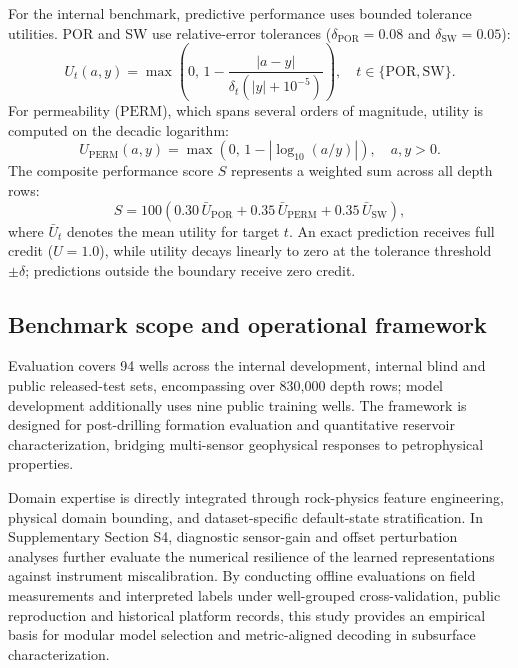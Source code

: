 \documentclass[preprint,12pt,nopreprintline]{elsarticle}
\begin{document}
For the internal benchmark, predictive performance uses bounded tolerance utilities. POR and SW use relative-error tolerances ($\delta_{\mathrm{POR}} = 0.08$ and $\delta_{\mathrm{SW}} = 0.05$):
\begin{equation}
U_t(a, y) = \max\left(0,\, 1 - \frac{|a - y|}{\delta_t (|y| + 10^{-5})}\right), \quad t \in \{\mathrm{POR}, \mathrm{SW}\}.
\end{equation}
For permeability ($\mathrm{PERM}$), which spans several orders of magnitude, utility is computed on the decadic logarithm:
\begin{equation}
U_{\mathrm{PERM}}(a, y) = \max\left(0,\, 1 - |\log_{10}(a/y)|\right), \quad a,y>0.
\end{equation}
The composite performance score $S$ represents a weighted sum across all depth rows:
\begin{equation}
S = 100 \left(0.30\,\bar{U}_{\mathrm{POR}} + 0.35\,\bar{U}_{\mathrm{PERM}} + 0.35\,\bar{U}_{\mathrm{SW}}\right),
\end{equation}
where $\bar{U}_t$ denotes the mean utility for target $t$. An exact prediction receives full credit ($U=1.0$), while utility decays linearly to zero at the tolerance threshold $\pm \delta$; predictions outside the boundary receive zero credit.

\subsection{Benchmark scope and operational framework}
Evaluation covers 94 wells across the internal development, internal blind and public released-test sets, encompassing over 830,000 depth rows; model development additionally uses nine public training wells. The framework is designed for post-drilling formation evaluation and quantitative reservoir characterization, bridging multi-sensor geophysical responses to petrophysical properties.

Domain expertise is directly integrated through rock-physics feature engineering, physical domain bounding, and dataset-specific default-state stratification. In Supplementary Section S4, diagnostic sensor-gain and offset perturbation analyses further evaluate the numerical resilience of the learned representations against instrument miscalibration. By conducting offline evaluations on field measurements and interpreted labels under well-grouped cross-validation, public reproduction and historical platform records, this study provides an empirical basis for modular model selection and metric-aligned decoding in subsurface characterization.
\end{document}
